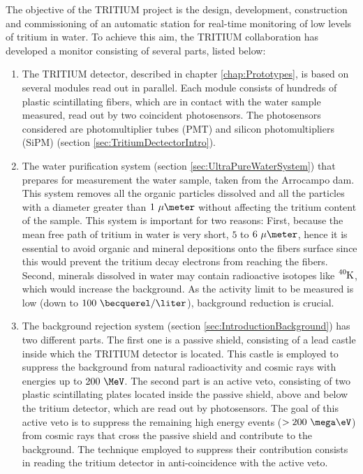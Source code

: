The objective of the TRITIUM project is the design, development, construction and commissioning of an automatic station for real-time monitoring of low levels of tritium in water. To achieve this aim, the TRITIUM collaboration has developed a monitor consisting of several parts, listed below: 

\begin{enumerate}

\item{} The TRITIUM detector, described in chapter \ref{chap:Prototypes}, is based on several modules read out in parallel. Each module consists of hundreds of plastic scintillating fibers, which are in contact with the water sample measured, read out by two coincident photosensors. The photosensors considered are photomultiplier tubes (PMT) and silicon photomultipliers (SiPM) (section \ref{sec:TritiumDectectorIntro}).

\item{} The water purification system (section \ref{sec:UltraPureWaterSystem}) that prepares for measurement the water sample, taken from the Arrocampo dam. This system removes all the organic particles dissolved and all the particles with a diameter greater than $1~\mu\meter$ without affecting the tritium content of the sample. This system is important for two reasons: First, because the mean free path of tritium in water is very short, $5$ to $6~\mu\meter$,  hence it is essential to avoid organic and mineral depositions onto the fibers surface since this would prevent the tritium decay electrons from reaching the fibers. Second, minerals dissolved in water may contain radioactive isotopes like $\ce{^{40}K}$, which would increase the background. As the activity limit to be measured is low (down to $100~\becquerel/\liter$), background reduction is crucial.

\item{} The background rejection system (section \ref{sec:IntroductionBackground}) has two different parts. The first one is a passive shield, consisting of a lead castle inside which the TRITIUM detector is located. This castle is employed to suppress the background from natural radioactivity and cosmic rays with energies up to $200~\MeV$. The second part is an active veto, consisting of two plastic scintillating plates located inside the passive shield, above and below the tritium detector, which are read out by photosensors. The goal of this active veto is to suppress the remaining high energy events ($>200~\mega\eV$) from cosmic rays that cross the passive shield and contribute to the background. The technique employed to suppress their contribution consists in reading the tritium detector in anti-coincidence with the active veto.


\end{enumerate}
